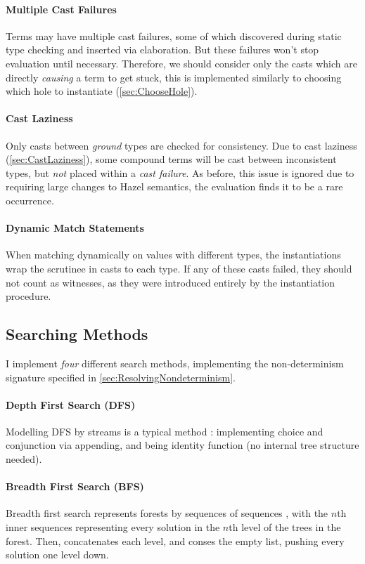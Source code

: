 \paragraph{Multiple Cast Failures} Terms may have multiple cast failures, some of which discovered during static type checking and inserted via elaboration. But these failures won't stop evaluation until necessary. Therefore, we should consider only the casts which are directly \textit{causing} a term to get stuck, this is implemented similarly to choosing which hole to instantiate (\cref{sec:ChooseHole}).

\paragraph{Cast Laziness}
\label{sec:SearchCastLaziness}
Only casts between \textit{ground} types are checked for consistency. Due to cast laziness (\cref{sec:CastLaziness}), some compound terms will be cast between inconsistent types, but \textit{not} placed within a \textit{cast failure}. As before, this issue is ignored due to requiring large changes to Hazel semantics, the evaluation finds it to be a rare occurrence.

\paragraph{Dynamic Match Statements} When matching dynamically on values with different types, the instantiations wrap the scrutinee in casts to each type. If any of these casts failed, they should not count as witnesses, as they were introduced entirely by the instantiation procedure. 

\subsection{Searching Methods}\label{sec:SearchMethods}
I implement \textit{four} different search methods, implementing the non-determinism signature specified in \cref{sec:ResolvingNondeterminism}.

\paragraph{Depth First Search (DFS)}
Modelling DFS by streams is a typical method \cite{ListOfSuccess}: implementing choice and conjunction via appending, and  being identity function (no internal tree structure needed).

\paragraph{Breadth First Search (BFS)}
Breadth first search represents forests by sequences of sequences \cite{BFSCombinators}, with the $n$th inner sequences representing every solution in the $n$th level of the trees in the forest. Then,  concatenates each level, and  conses the empty list, pushing every solution one level down.

